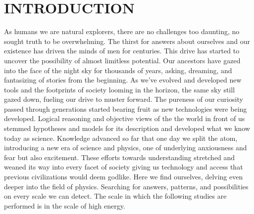 
\begingroup
\clearpage%
\let\clearpage\relax%
\vspace*{-16pt}%
\chapter[INTRODUCTION]{INTRODUCTION}\label{chap:intro}
\endgroup

As humans we are natural explorers, there are no challenges too daunting, no sought truth to be overwhelming. 
The thirst for answers about ourselves and our existence has driven the minds of men for centuries. This drive
has started to uncover the possibility of almost limitless potential. Our ancestors have gazed into the face 
of the night sky for thousands of years, asking, dreaming, and fantasizing of stories from the beginning. As 
we've evolved and developed new tools and the footprints of society looming in the horizon, the same sky 
still gazed down, fueling our drive to muster forward. The pureness of our curiosity passed through generations
started bearing fruit as new technologies were being developed. Logical reasoning and objective views of the 
the world in front of us stemmed hypotheses and models for its description and developed what we know today as 
science. Knowledge advanced so far that one day we split the atom, introducing a new era of science and physics, one of 
underlying anxiousness and fear but also excitement. These efforts towards understanding stretched and weaned its way 
into every facet of society giving us technology and access that previous civilizations would deem godlike. 
Here we find ourselves, delving even deeper into the field of physics. Searching for answers, patterns, 
and possibilities on every scale we can detect. The scale in which the following studies are performed is in 
the scale of high energy. 
\par

